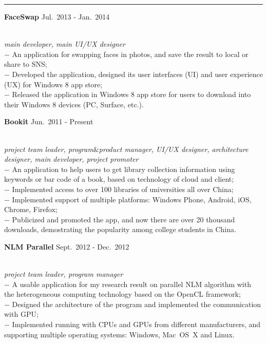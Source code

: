 \documentclass[a4paper,10pt]{article}
\newcommand{\shadedsection}[1]{
    \setlength{\fboxsep}{0pt}
    \colorbox{shadecolor}{%
        \begin{minipage}{\linewidth}%
            \vspace{0.2em}%
            #1%
        \end{minipage}%
    }
}
\newenvironment{rSection}[1]{ %
  \medskip
  \hspace{-1.5em}{\color{Blue}\MakeUppercase{\large \bf {#1}}} %
  \vspace{-0.2em}
  \medskip
  \hrule %
  \begin{list}{}{ %
    \setlength{\leftmargin}{1.5em} %
  }
\setlength{\itemsep}{1pt}
  \item[]
}{
  \end{list}
}
\newcommand{\detail}[1]{{$-$ {#1}}}
\newcommand{\period}[3]{\normalsize {#1} \hfill {#2} - {#3}}
\begin{document}
\begin{rSection}{Main Projects}
  \vspace{-1.5em}
  \item
    \shadedsection{\period{\bf FaceSwap}{Jul.~2013}{Jan.~2014}}\\
    {\em main developer, main UI/UX designer}\\
    \detail{An application for swapping faces in photos, and save the result to local or share to SNS;}\\
    \detail{Developed the application, designed its user interfaces (UI) and user experience (UX) for Windows 8 app store;}\\
    \detail{Released the application in Windows 8 app store for users to download into their Windows 8 devices (PC, Surface, etc.).}
    
  \item
    \shadedsection{\period{\bf Bookit}{Jun.~2011}{Present}}\\
    {\em project team leader, program$\&$product manager, UI/UX designer, architecture designer, main developer, project promoter}\\
    \detail{An application to help users to get library collection information using keywords or bar code of a book, based on technology of cloud and client;}\\
    \detail{Implemented access to over 100 libraries of universities all over China;}\\
    \detail{Implemented support of multiple platforms: Windows Phone, Android, iOS, Chrome, Firefox;}\\
    \detail{Publicized and promoted the app, and now there are over 20 thousand downloads, demostrating the popularity among college students in China.}
    
  \item
    \shadedsection{\period{\bf NLM Parallel}{Sept.~2012}{Dec.~2012}}\\
    {\em project team leader, program manager}\\
    \detail{A usable application for my research result on parallel NLM algorithm with the heterogeneous computing technology based on the OpenCL framework;}\\
    \detail{Designed the architecture of the program and implemented the communication with GPU;}\\
    \detail{Implemented running with CPUs and GPUs from different manufacturers, and supporting multiple operating systems: Windows, Mac~OS~X and Linux.}
    

\end{rSection}
\end{document}
